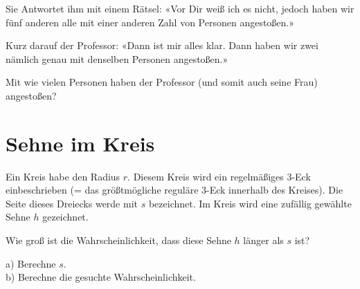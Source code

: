 Sie Antwortet ihm mit einem Rätsel: «Vor Dir weiß ich es nicht, jedoch haben
wir fünf anderen alle mit einer anderen Zahl von Personen angestoßen.»

Kurz darauf der Professor: «Dann ist mir alles klar. Dann haben wir zwei
nämlich genau mit denselben Personen angestoßen.»

Mit wie vielen Personen haben der Professor (und somit auch seine Frau)
angestoßen?

\TNTeop{}






\section{Sehne im Kreis}



Ein Kreis habe den Radius $r$. Diesem Kreis wird ein regelmäßiges 3-Eck
einbeschrieben (= das größtmögliche reguläre 3-Eck innerhalb des Kreises). Die Seite dieses Dreiecks
werde mit $s$ bezeichnet. Im Kreis wird eine zufällig gewählte Sehne $h$
gezeichnet.

Wie groß ist die Wahrscheinlichkeit, dass diese Sehne $h$ länger als $s$ ist?

a) Berechne $s$.\\
b) Berechne die gesuchte Wahrscheinlichkeit.


\TNTeop{}

